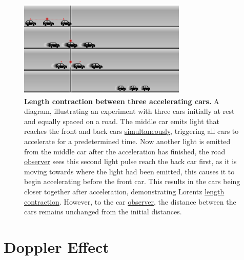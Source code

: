 \begin{figure}[H]
	\centering
	\includegraphics[width = 8cm]{images/pdf/cars.pdf}
	\caption{\textbf{Length contraction between three accelerating cars.} A diagram, illustrating an experiment with three cars initially at rest and equally spaced on a road. The middle car emits light that reaches the front and back cars \protect\hyperlink{def-simultaneity}{simultaneously}, triggering all cars to accelerate for a predetermined time. Now another light is emitted from the middle car after the acceleration has finished, the road \protect\hyperlink{def-observer}{observer} sees this second light pulse reach the back car first, as it is moving towards where the light had been emitted, this causes it to begin accelerating before the front car. This results in the cars being closer together after acceleration, demonstrating Lorentz \protect\hyperlink{def-length-contraction}{length contraction}. However, to the car \protect\hyperlink{def-observer}{observer}, the distance between the cars remains unchanged from the initial distances.}
	\label{fig: cars}
\end{figure}

\section{Doppler Effect} \label{sect: Intro Doppler Effect}

